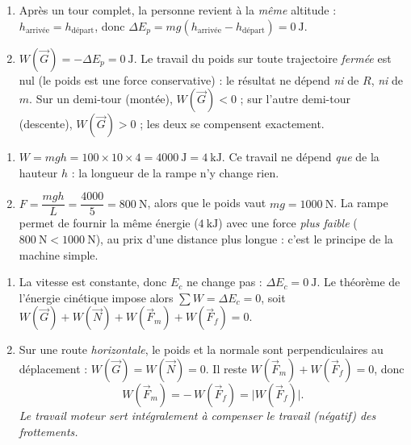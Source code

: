 \documentclass[11pt,a4paper]{article}
\newcommand{\vv}[1]{\vec{#1}}\newcommand{\ds}{\displaystyle}
\begin{document}

\begin{corrige}
\begin{enumerate}[label=\alph*)]
  \item Après un tour complet, la personne revient à la \emph{même} altitude : $h_{\text{arrivée}}=h_{\text{départ}}$,
        donc $\Delta E_p=mg(h_{\text{arrivée}}-h_{\text{départ}})=\qty{0}{\joule}$.
  \item $W(\vv G)=-\Delta E_p=\qty{0}{\joule}$. Le travail du poids sur toute trajectoire
        \emph{fermée} est nul (le poids est une force conservative) : le résultat ne dépend
        \emph{ni} de $R$, \emph{ni} de $m$. Sur un demi-tour (montée), $W(\vv G)<0$ ; sur l'autre
        demi-tour (descente), $W(\vv G)>0$ ; les deux se compensent exactement.
\end{enumerate}
\end{corrige}

\begin{corrige}
\begin{enumerate}[label=\alph*)]
  \item $W=mgh=100\times10\times4=\qty{4000}{\joule}=\qty{4}{\kilo\joule}$. Ce travail ne dépend
        \emph{que} de la hauteur $h$ : la longueur de la rampe n'y change rien.
  \item $F=\dfrac{mgh}{L}=\dfrac{4000}{5}=\qty{800}{\newton}$, alors que le poids vaut
        $mg=\qty{1000}{\newton}$. La rampe permet de fournir la même énergie ($\qty{4}{\kilo\joule}$)
        avec une force \emph{plus faible} ($\qty{800}{\newton}<\qty{1000}{\newton}$), au prix d'une
        distance plus longue : c'est le principe de la machine simple.
\end{enumerate}
\end{corrige}

\begin{corrige}
\begin{enumerate}[label=\alph*)]
  \item La vitesse est constante, donc $E_c$ ne change pas : $\Delta E_c=\qty{0}{\joule}$. Le théorème
        de l'énergie cinétique impose alors $\sum W=\Delta E_c=0$, soit
        $W(\vv G)+W(\vv N)+W(\vv F_m)+W(\vv F_f)=0$.
  \item Sur une route \emph{horizontale}, le poids et la normale sont perpendiculaires au déplacement :
        $W(\vv G)=W(\vv N)=0$. Il reste $W(\vv F_m)+W(\vv F_f)=0$, donc
        \[
        W(\vv F_m)=-\,W(\vv F_f)=\bigl|W(\vv F_f)\bigr|.
        \]
        \emph{Le travail moteur sert intégralement à compenser le travail (négatif) des frottements.}
\end{enumerate}
\end{corrige}
\end{document}
